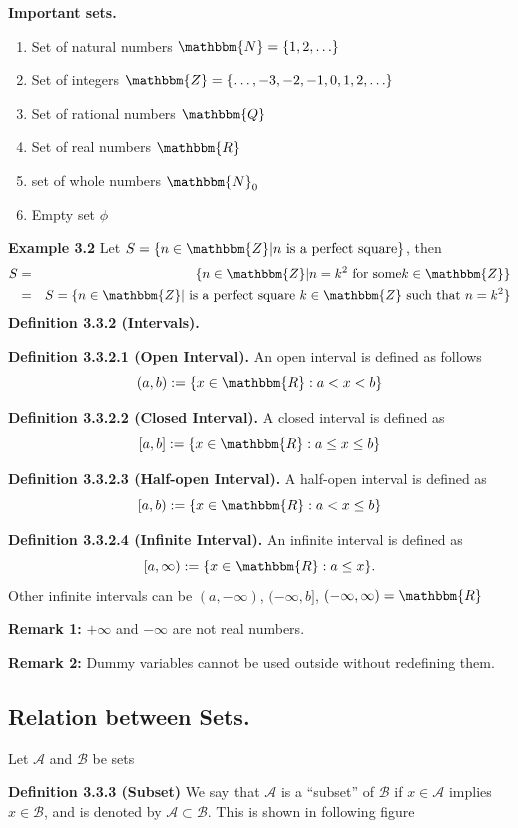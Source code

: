 \documentclass[a4paper,10pt]{article}
\begin{document}
\textbf{Important sets.}
\begin{enumerate}
 \item Set of natural numbers $\mathbbm{N} =\{1,2,\ldots\}$
 \item Set of integers $\mathbbm{Z} =\{\ldots,-3,-2,-1,0, 1,2,\ldots\}$
 \item Set of rational numbers $\mathbbm{Q}$
 \item Set of real numbers $\mathbbm{R}$
 \item set of whole numbers $\mathbbm{N}_0$
  \item Empty set $\phi$ 
\end{enumerate}

\textbf{Example 3.2} Let $S=\{n\in \mathbbm{Z}| n \text{ is a perfect square}\}$, then 
\begin{eqnarray*}
 S&=&\{n\in \mathbbm{Z}| n =k^2\text{ for some} k\in \mathbbm{Z}\}\\
 &=&S=\{n\in \mathbbm{Z}| \text{ is a perfect square } k\in \mathbbm{Z} \text{ such that } n=k^2 \}
\end{eqnarray*}
\textbf{Definition 3.3.2 (Intervals).}

\textbf{Definition 3.3.2.1 (Open Interval).} An open interval is defined as follows $$(a,b):= \{x\in \mathbbm{R}: a<x<b\}$$

\textbf{Definition 3.3.2.2 (Closed Interval).} A closed interval is defined as $$[a,b]:= \{x\in \mathbbm{R}: a\leq x\leq b\}$$

\textbf{Definition 3.3.2.3 (Half-open Interval).} A half-open interval is defined as  $$[a,b):= \{x\in \mathbbm{R}: a<x\leq b\}$$

\textbf{Definition 3.3.2.4 (Infinite Interval).} An infinite interval is defined as $$[a,\infty):= \{x\in \mathbbm{R}: a\leq x\}.$$ Other infinite intervals can be $(a,-\infty)$, $(-\infty,b]$, $(-\infty,\infty)=\mathbbm{R}$

\textbf{Remark 1:} $+\infty$ and $-\infty$ are not real numbers.

\textbf{Remark 2:} Dummy variables cannot be used outside without redefining them.
\subsection{Relation between Sets.}
 Let $\mathcal{A}$ and $\mathcal{B}$ be sets
 
 \textbf{Definition 3.3.3 (Subset)} We say that $\mathcal{A}$ is a ``subset'' of $\mathcal{B}$ if $x\in \mathcal{A}$ implies $x\in \mathcal{B}$, and is denoted by $\mathcal{A}\subset \mathcal{B}$. This is shown in following figure 
 
\end{document}
